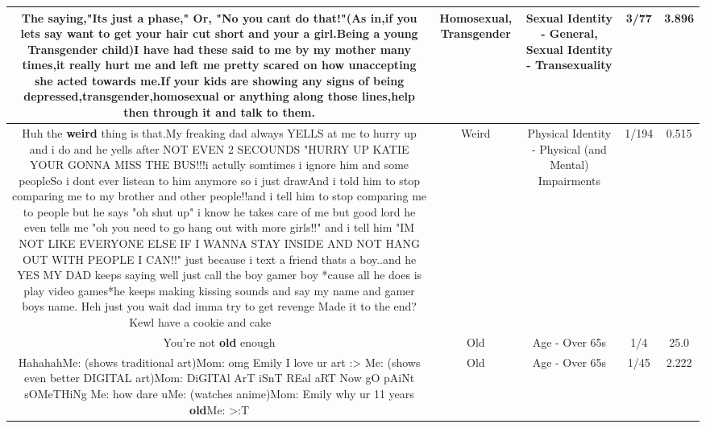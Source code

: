 \documentclass[11pt]{article}
\newlength\mylength
\begin{document}
\begin{center}
\begin{longtable}{|C{.65\mylength}|C{.30\mylength}|C{.12\mylength}|C{.12\mylength}|C{.12\mylength}|}
  \small The saying,"Its just a phase," Or, "No you cant do that!"(As in,if you lets say want to get your hair cut short and your a girl.Being a young \textbf{Transgender} child)I have had these said to me by my mother many times,it really hurt me and left me pretty scared on how unaccepting she acted towards me.If your kids are showing any signs of being depressed,\textbf{transgender},\textbf{homosexual} or anything along those lines,help then through it and talk to them.\normalsize   & Homosexual, Transgender & Sexual Identity - General, Sexual Identity - Transexuality & 3/77 & 3.896 \\  \hline
  \small Huh the \textbf{weird} thing is that.My freaking dad always YELLS at me to hurry up and i do and he yells after NOT EVEN 2 SECOUNDS "HURRY UP KATIE YOUR GONNA MISS THE BUS!!!i actully somtimes i ignore him and some peopleSo i dont ever listean to him anymore so i just drawAnd i told him to stop comparing me to my brother and other people!!and i tell him to stop comparing me to people but he says "oh shut up" i know he takes care of me but good lord he even tells me "oh you need to go hang out with more girls!!" and i tell him "IM NOT LIKE EVERYONE ELSE IF I WANNA STAY INSIDE AND NOT HANG OUT WITH PEOPLE I CAN!!" just because i text a friend thats a boy..and he YES MY DAD keeps saying well just call the boy gamer boy *cause all he does is play video games*he keeps making kissing sounds and say my name and gamer boys name. Heh just you wait dad imma try to get revenge Made it to the end? Kewl have a cookie and cake 🍪🍮🍦🍨🍧🎂🍰🍯🍭🍬🍫\normalsize   & Weird & Physical Identity - Physical (and Mental) Impairments & 1/194 & 0.515 \\  \hline
  \small You're not \textbf{old} enough\normalsize   & Old & Age - Over 65s & 1/4 & 25.0 \\  \hline
  \small HahahahMe: (shows traditional art)Mom: omg Emily I love ur art :> Me: (shows even better DIGITAL art)Mom: DiGITAl ArT iSnT REal aRT Now gO pAiNt sOMeTHiNg Me: how dare uMe: (watches anime)Mom: Emily why ur 11 years \textbf{old}Me: >:T\normalsize   & Old & Age - Over 65s & 1/45 & 2.222 \\  \hline

\end{longtable}
\end{center}
\end{document}
